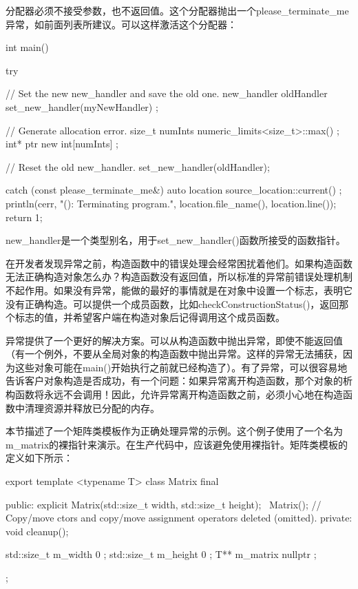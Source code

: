 分配器必须不接受参数，也不返回值。这个分配器抛出一个please\_terminate\_me异常，如前面列表所建议。可以这样激活这个分配器：

\begin{cpp}
int main()
{
    try {
        // Set the new new_handler and save the old one.
        new_handler oldHandler { set_new_handler(myNewHandler) };

        // Generate allocation error.
        size_t numInts { numeric_limits<size_t>::max() };
        int* ptr { new int[numInts] };

        // Reset the old new_handler.
        set_new_handler(oldHandler);
    } catch (const please_terminate_me&) {
        auto location { source_location::current() };
        println(cerr, "{}({}): Terminating program.",
            location.file_name(), location.line());
        return 1;
    }
}
\end{cpp}

new\_handler是一个类型别名，用于set\_new\_handler()函数所接受的函数指针。


在开发者发现异常之前，构造函数中的错误处理会经常困扰着他们。如果构造函数无法正确构造对象怎么办？构造函数没有返回值，所以标准的异常前错误处理机制不起作用。如果没有异常，能做的最好的事情就是在对象中设置一个标志，表明它没有正确构造。可以提供一个成员函数，比如checkConstructionStatus()，返回那个标志的值，并希望客户端在构造对象后记得调用这个成员函数。

异常提供了一个更好的解决方案。可以从构造函数中抛出异常，即使不能返回值（有一个例外，不要从全局对象的构造函数中抛出异常。这样的异常无法捕获，因为这些对象可能在main()开始执行之前就已经构造了）。有了异常，可以很容易地告诉客户对象构造是否成功，有一个问题：如果异常离开构造函数，那个对象的析构函数将永远不会调用！因此，允许异常离开构造函数之前，必须小心地在构造函数中清理资源并释放已分配的内存。

本节描述了一个矩阵类模板作为正确处理异常的示例。这个例子使用了一个名为m\_matrix的裸指针来演示。在生产代码中，应该避免使用裸指针。矩阵类模板的定义如下所示：

\begin{cpp}
export template <typename T>
class Matrix final
{
    public:
        explicit Matrix(std::size_t width, std::size_t height);
        ~Matrix();
        // Copy/move ctors and copy/move assignment operators deleted (omitted).
    private:
        void cleanup();

        std::size_t m_width { 0 };
        std::size_t m_height { 0 };
        T** m_matrix { nullptr };
};
\end{cpp}


